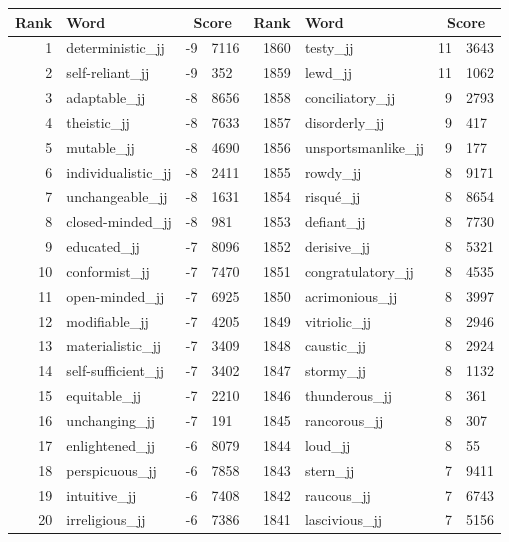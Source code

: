 \begin{table}[tbp]
    \begin{tabular}{| rlr@{.}l | rlr@{.}l |}
    \hline
    \textbf{Rank} & \textbf{Word} & \multicolumn{2}{c|}{\textbf{Score}} & \textbf{Rank} & \textbf{Word} & \multicolumn{2}{c|}{\textbf{Score}} \\
    \hline
    1 & deterministic\_jj & -9 & 7116    &    1860 & testy\_jj & 11 & 3643 \\
    2 & self-reliant\_jj & -9 & 352    &    1859 & lewd\_jj & 11 & 1062 \\
    3 & adaptable\_jj & -8 & 8656    &    1858 & conciliatory\_jj & 9 & 2793 \\
    4 & theistic\_jj & -8 & 7633    &    1857 & disorderly\_jj & 9 & 417 \\
    5 & mutable\_jj & -8 & 4690    &    1856 & unsportsmanlike\_jj & 9 & 177 \\
    6 & individualistic\_jj & -8 & 2411    &    1855 & rowdy\_jj & 8 & 9171 \\
    7 & unchangeable\_jj & -8 & 1631    &    1854 & risqué\_jj & 8 & 8654 \\
    8 & closed-minded\_jj & -8 & 981    &    1853 & defiant\_jj & 8 & 7730 \\
    9 & educated\_jj & -7 & 8096    &    1852 & derisive\_jj & 8 & 5321 \\
    10 & conformist\_jj & -7 & 7470    &    1851 & congratulatory\_jj & 8 & 4535 \\
    11 & open-minded\_jj & -7 & 6925    &    1850 & acrimonious\_jj & 8 & 3997 \\
    12 & modifiable\_jj & -7 & 4205    &    1849 & vitriolic\_jj & 8 & 2946 \\
    13 & materialistic\_jj & -7 & 3409    &    1848 & caustic\_jj & 8 & 2924 \\
    14 & self-sufficient\_jj & -7 & 3402    &    1847 & stormy\_jj & 8 & 1132 \\
    15 & equitable\_jj & -7 & 2210    &    1846 & thunderous\_jj & 8 & 361 \\
    16 & unchanging\_jj & -7 & 191    &    1845 & rancorous\_jj & 8 & 307 \\
    17 & enlightened\_jj & -6 & 8079    &    1844 & loud\_jj & 8 & 55 \\
    18 & perspicuous\_jj & -6 & 7858    &    1843 & stern\_jj & 7 & 9411 \\
    19 & intuitive\_jj & -6 & 7408    &    1842 & raucous\_jj & 7 & 6743 \\
    20 & irreligious\_jj & -6 & 7386    &    1841 & lascivious\_jj & 7 & 5156 \\

\end{tabular}
\end{table}
